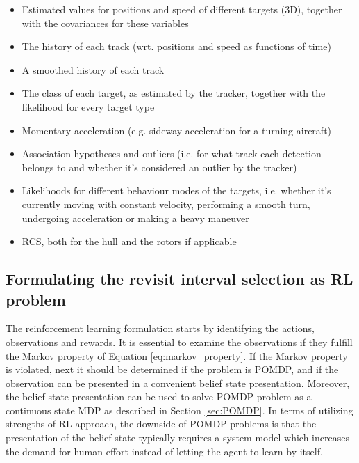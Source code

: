 \documentclass[english, 12pt, a4paper, elec, utf8, a-1b, online]{aaltothesis}
\begin{document}
\begin{itemize}
    \item Estimated values for positions and speed of different targets (3D), together with the covariances for these variables
    \item The history of each track (wrt. positions and speed as functions of time)
    \item A smoothed history of each track
    \item The class of each target, as estimated by the tracker, together with the likelihood for every target type
    \item Momentary acceleration (e.g. sideway acceleration for a turning aircraft)
    \item Association hypotheses and outliers (i.e. for what track each detection belongs to and whether it's considered an outlier by the tracker)
    \item Likelihoods for different behaviour modes of the targets, i.e. whether it's currently moving with constant velocity, performing a smooth turn, undergoing acceleration or making a heavy maneuver
    \item RCS, both for the hull and the rotors if applicable
\end{itemize}

\subsection{Formulating the revisit interval selection as RL problem}\label{sec:RL_formulation}

The reinforcement learning formulation starts by identifying the actions, observations and rewards.
It is essential to examine the observations if they fulfill the Markov property of Equation \eqref{eq:markov_property}.
If the Markov property is violated, next it should be determined if the problem is POMDP, and if the observation can be presented in a convenient belief state presentation.
Moreover, the belief state presentation can be used to solve POMDP problem as a continuous state MDP as described in Section \ref{sec:POMDP}.
In terms of utilizing strengths of RL approach, the downside of POMDP problems is that the presentation of the belief state typically requires a system model which increases the demand for human effort instead of letting the agent to learn by itself.
\end{document}
